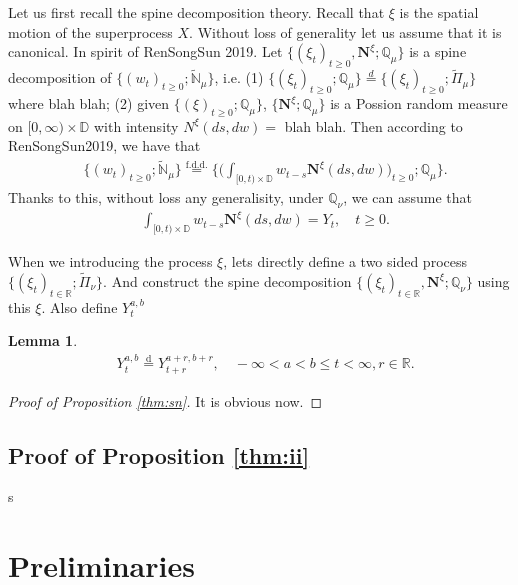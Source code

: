 \documentclass[12pt,a4paper]{amsart}
\numberwithin{equation}{section}
\theoremstyle{plain}
\newtheorem{lem}[thm]{Lemma}
\theoremstyle{definition}
\theoremstyle{remark}
\begin{document}
Let us first recall the spine decomposition theory. 
{\color{blue} Recall that $\xi$ is the spatial motion of the superprocess $X$. 
Without loss of generality let us assume that it is canonical.}
In spirit of RenSongSun 2019.
Let $\{(\xi_t)_{t\geq 0}, \mathbf N^\xi; \mathbb Q_\mu\}$ is a spine decomposition of $\{(w_t)_{t\geq 0}; \widetilde {\mathbb N}_\mu\}$, i.e.
(1) $\{(\xi_t)_{t\geq 0}; \mathbb Q_\mu\} \overset{d}= \{(\xi_t)_{t\geq 0}; \widetilde \Pi_{\mu} \}$ {\color{blue} where blah blah}; 
(2) given $\{(\xi)_{t\geq 0}; \mathbb Q_\mu\}$, $\{\mathbf N^\xi; \mathbb Q_\mu\}$ is a Possion random measure on $[0,\infty) \times \mathbb D$ with intensity $N^\xi(ds,dw) =  $ {\color{blue} blah blah}. 
Then according to RenSongSun2019, we have that
\begin{align} 
 & \{(w_t)_{t\geq 0}; \widetilde{ \mathbb N}_\mu \} \overset{\text{f.d.d.}} = \Big\{ \Big( \int_{[0,t)\times \mathbb D} w_{t-s} \mathbf N^\xi(ds,dw) \Big)_{t\geq 0} ; \mathbb Q_\mu\Big\}. 
 \end{align}
Thanks to this, without loss any generalisity, under $\mathbb Q_\nu$, we can assume that 
\begin{align} 
&  \int_{[0,t)\times \mathbb D} w_{t-s} \mathbf N^\xi(ds,dw) = Y_t, \quad t\geq 0.
\end{align} 

{\color{blue} When we introducing the process $\xi$, lets directly define a two sided process $\{(\xi_t)_{t\in \mathbb R}; \widetilde \Pi_\nu\}$. And construct the spine decomposition $\{ (\xi_t)_{t\in \mathbb R}, \mathbf N^\xi; \mathbb Q_\nu\}$ using this $\xi$. Also define $Y_t^{a,b}$}

\begin{lem} \color{red}
\begin{align} 
& Y_t^{a,b} \overset{\text{d}}= Y_{t+r}^{a+r,b+r}, \quad -\infty < a<b\leq t < \infty, r\in \mathbb R.
\end{align}
\end{lem}

\begin{proof}[Proof of Proposition \ref{thm:sn}]
	{\color{blue} It is obvious now.}
\end{proof}

\subsection{Proof of Proposition \ref{thm:ii}}
s

\section{Preliminaries}
\end{document}
